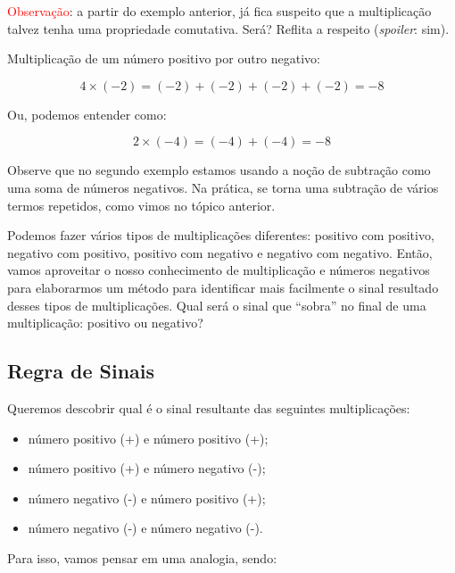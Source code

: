 \textcolor{red}{Observação}: a partir do exemplo anterior, já fica suspeito que a multiplicação talvez tenha uma propriedade comutativa. Será? Reflita a respeito (\textit{spoiler}: sim).

\begin{exemplo}
    Multiplicação de um número positivo por outro negativo:

    \begin{equation}
        4 \times (-2) = (-2)+(-2)+(-2)+(-2) = -8 
    \end{equation}

    Ou, podemos entender como:

    \begin{equation}
        2 \times (-4) = (-4) + (-4) = -8
    \end{equation}
\end{exemplo}

Observe que no segundo exemplo estamos usando a noção de subtração como uma soma de números negativos. Na prática, se torna uma subtração de vários termos repetidos, como vimos no tópico anterior. 

Podemos fazer vários tipos de multiplicações diferentes: positivo com positivo, negativo com positivo, positivo com negativo e negativo com negativo. Então, vamos aproveitar o nosso conhecimento de multiplicação e números negativos para elaborarmos um método para identificar mais facilmente o sinal resultado desses tipos de multiplicações. Qual será o sinal que ``sobra'' no final de uma multiplicação: positivo ou negativo?

\subsection{Regra de Sinais}

Queremos descobrir qual é o sinal resultante das seguintes multiplicações:

\begin{itemize}
    \item número positivo (+) e número positivo (+); 
    \item número positivo (+) e número negativo (-); 
    \item número negativo (-) e número positivo (+); 
    \item número negativo (-) e número negativo (-).
\end{itemize}

Para isso, vamos pensar em uma analogia, sendo:

